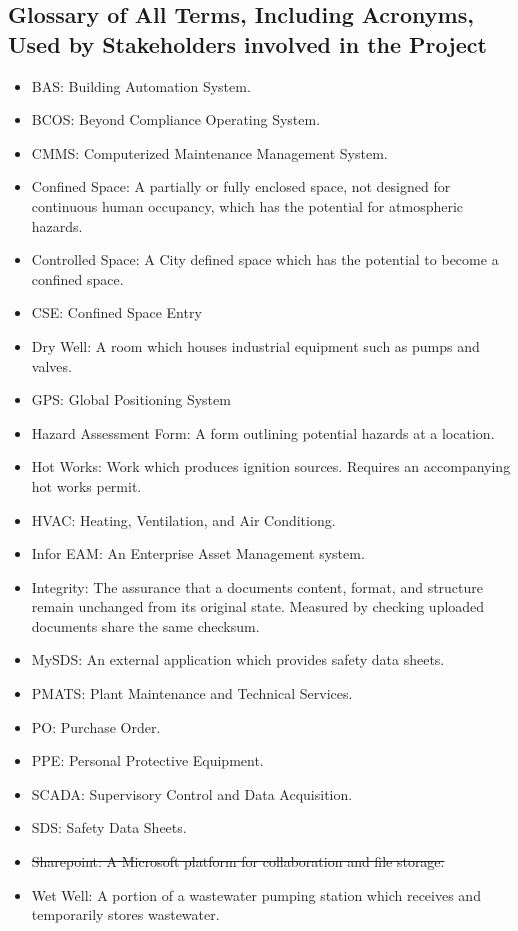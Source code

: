 \documentclass[12pt]{article}
\begin{document}
\subsection{Glossary of All Terms, Including Acronyms, Used by Stakeholders
involved in the Project}
\begin{itemize}
  \item BAS: Building Automation System.
  \item BCOS: Beyond Compliance Operating System.
  \item CMMS: Computerized Maintenance Management System.
  \item Confined Space: A partially or fully enclosed space, not designed for
    continuous human occupancy, which has the potential for atmospheric hazards.
  \item Controlled Space: A City defined space which has the potential to
    become a confined space.
  \item CSE: Confined Space Entry
  \item Dry Well: A room which houses industrial equipment such as pumps
    and valves.
  \item GPS: Global Positioning System
  \item Hazard Assessment Form: A form outlining potential
    hazards at a location.
  \item Hot Works: Work which produces ignition sources.
    Requires an accompanying hot works permit.
  \item HVAC: Heating, Ventilation, and Air Conditiong.
  \item Infor EAM: An Enterprise Asset Management system.
  \item Integrity: The assurance that a documents content, format, and structure remain unchanged from its original state.
  Measured by checking uploaded documents share the same checksum.
  \item MySDS: An external application which provides safety data sheets.
  \item PMATS: Plant Maintenance and Technical Services.
  \item PO: Purchase Order.
  \item PPE: Personal Protective Equipment.
  \item SCADA: Supervisory Control and Data Acquisition.
  \item SDS: Safety Data Sheets.
  \item \sout{Sharepoint: A Microsoft platform for collaboration and file storage.}
  \item Wet Well: A portion of a wastewater pumping station which receives
    and temporarily stores wastewater.
\end{itemize}
\end{document}
